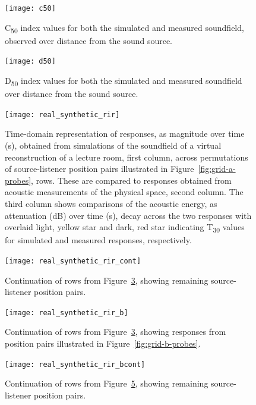 \begin{figure}
    \centering
    \texttt{[image: c50]}
    \caption{C\textsubscript{50} index values for both the simulated and measured soundfield, observed over distance from the sound source.}
    \label{fig:c50comparison}
\end{figure}
\begin{figure}
    \centering
    \texttt{[image: d50]}
    \caption{D\textsubscript{50} index values for both the simulated and measured soundfield over distance from the sound source.}
    \label{fig:d50comparison}
\end{figure}

\begin{figure}
    \centering
    \texttt{[image: real\_synthetic\_rir]}
    \caption{Time-domain representation of responses, as magnitude over time (s), obtained from simulations of the soundfield of a virtual reconstruction of a lecture room, first column, across permutations of source-listener position pairs illustrated in Figure~\ref{fig:grid-a-probes}, rows. These are compared to responses obtained from acoustic measurements of the physical space, second column. The third column shows comparisons of the acoustic energy, as attenuation (dB) over time (s), decay across the two responses with overlaid light, yellow star and dark, red star indicating T\textsubscript{30} values for simulated and measured responses, respectively.}
    \label{fig:rir-comparisons-grid-a}
\end{figure}
\begin{figure}
    \centering
    \texttt{[image: real\_synthetic\_rir\_cont]}
    \caption{Continuation of rows from Figure~\ref{fig:rir-comparisons-grid-a}, showing remaining source-listener position pairs.}
    \label{fig:rir-comparisons-grid-a2}
\end{figure}
\begin{figure}
    \centering
    \texttt{[image: real\_synthetic\_rir\_b]}
    \caption{Continuation of rows from Figure~\ref{fig:rir-comparisons-grid-a}, showing responses from position pairs illustrated in Figure~\ref{fig:grid-b-probes}.}
    \label{fig:rir-comparisons-grid-b}
\end{figure}
\begin{figure}
    \centering
    \texttt{[image: real\_synthetic\_rir\_bcont]}
    \caption{Continuation of rows from Figure~\ref{fig:rir-comparisons-grid-b}, showing remaining source-listener position pairs.}
    \label{fig:rir-comparisons-grid-b2}
\end{figure}



